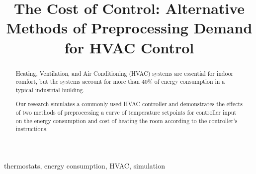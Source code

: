 \documentclass[conference,letterpaper]{IEEEtran}
\begin{document}

\title{The Cost of Control: Alternative Methods of Preprocessing Demand for HVAC Control}
%
\author{
}

\maketitle

\begin{abstract}
Heating, Ventilation, and Air Conditioning (HVAC) systems are essential for indoor comfort, but the systems account for more than $40\%$ of energy consumption in a typical industrial building. 

Our research simulates a commonly used HVAC controller and demonstrates the effects of two methods of preprocessing a curve of temperature setpoints for controller input on the energy consumption and cost of heating the room according to the controller's instructions.
\end{abstract}

\begin{IEEEkeywords}
thermostats, energy consumption, HVAC, simulation
\end{IEEEkeywords}
\end{document}
